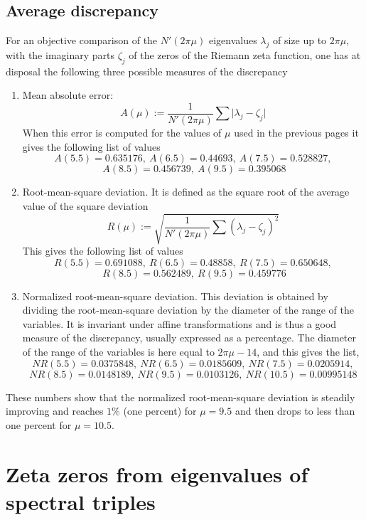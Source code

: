 \documentclass[cupthm]{CUP-JNL-JMJ}
\numberwithin{equation}{section}
\theoremstyle{cupplain}
\theoremstyle{cupdefinition}
\theoremstyle{cupremark}
\theoremstyle{cupproof}
\begin{document}
 
   
  
  
   \subsection{Average discrepancy}
  
  For an objective comparison of  the $N'(2\pi \mu)$ eigenvalues $\lambda_j$ of size up to  $2\pi \mu$, with the imaginary parts $\zeta_j$ of the zeros of the Riemann zeta function, one has at disposal  the following three possible measures of the discrepancy 
  \begin{enumerate}
  \item Mean absolute error:
  $$
  A(\mu):=\frac{1}{N'(2\pi \mu)}\sum \vert \lambda_j-\zeta_j \vert
  $$ 
  When this error is computed for the values of $\mu$ used in the previous pages it gives the following list of values
  $$
  A(5.5)=0.635176, \ A(6.5)=0.44693, \ A(7.5)=0.528827, $$ $$\ A(8.5)=0.456739, \ A(9.5)=0.395068
  $$
  \item Root-mean-square deviation. It is defined as the square root of the average value of the square deviation
  $$
  R(\mu):=\sqrt{\frac{1}{N'(2\pi \mu)}\sum (\lambda_j-\zeta_j )^2}
  $$
  This gives the following list of values
$$
  R(5.5)=0.691088, \ R(6.5)=0.48858, \ R(7.5)=0.650648, $$ $$\ R(8.5)=0.562489, \ R(9.5)=0.459776
  $$
  \item Normalized root-mean-square deviation. This deviation  is obtained by dividing the root-mean-square deviation by the diameter of the range of the variables. It is invariant under affine transformations and is thus a good measure of the discrepancy, usually expressed as a percentage. The diameter of the range of the variables is here equal to  $2\pi \mu -14$, and this gives the list, 
    $$
  NR(5.5)=0.0375848, \  NR(6.5)=0.0185609, \ NR(7.5)=0.0205914, $$ $$ NR(8.5)=0.0148189, \ NR(9.5)=0.0103126, \ NR(10.5)=0.00995148
  $$ 
  \end{enumerate}
  These numbers  show that the normalized root-mean-square deviation is steadily improving and reaches $1\%$ (one percent) for $\mu=9.5$ and then  drops to less than one percent for $\mu=10.5$. 
  
  

   
  \section{Zeta zeros from eigenvalues of spectral triples}\label{2zeros}
  
\end{document}
